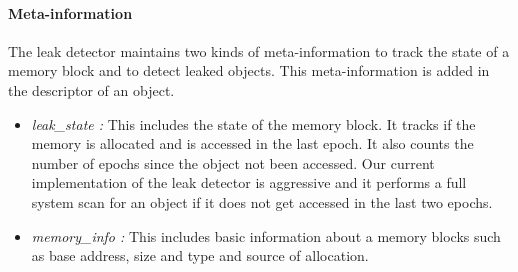 \paragraph{Meta-information}
The leak detector maintains two kinds of meta-information to track the state of a memory block and to detect leaked objects. This meta-information is added in the descriptor of an object. %
\begin{itemize}
\item \emph{leak\_state :} This includes the state of the memory block. It tracks if the memory is allocated and is accessed in the last epoch. It also counts the number of epochs since the object not been accessed. Our current implementation of the leak detector is aggressive and it performs a full system scan for an object if it does not get accessed in the last two epochs.
\item \emph{memory\_info :} This includes basic information about a memory blocks such as base address, size and type and source of allocation.
\end{itemize}






